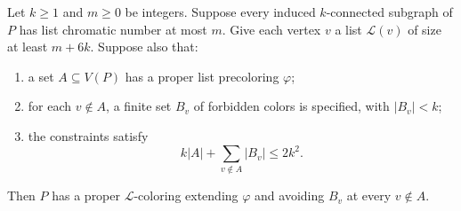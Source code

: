 \begin{lemma}\label{list:constrained-coloring}
Let $k\ge1$ and $m\ge0$ be integers. Suppose every induced $k$-connected
subgraph of $P$ has list chromatic number at most $m$. Give each vertex $v$
a list $\mathcal L(v)$ of size at least $m+6k$. Suppose also that:
\begin{enumerate}[label=\textup{(\roman*)}]
\item a set $A\subseteq V(P)$ has a proper list precoloring $\varphi$;
\item for each $v\notin A$, a finite set $B_v$ of forbidden colors is
specified, with $|B_v|<k$;
\item the constraints satisfy
\begin{equation}\label{list:eq-budget}
k|A|+\sum_{v\notin A}|B_v|\le2k^2.
\end{equation}
\end{enumerate}
Then $P$ has a proper $\mathcal L$-coloring extending $\varphi$ and avoiding
$B_v$ at every $v\notin A$.
\end{lemma}


